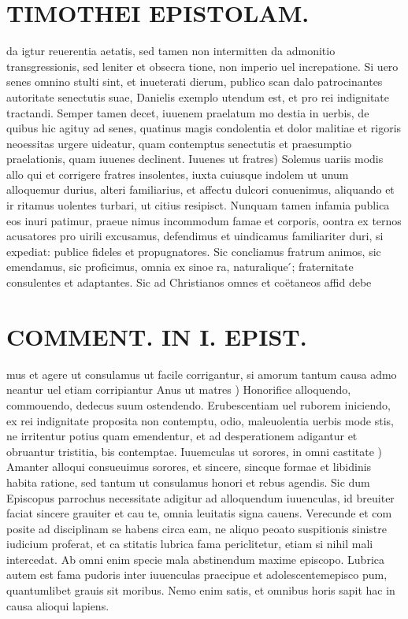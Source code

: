 \documentclass{article}
\begin{document}
\begin{pages}
\section*{TIMOTHEI EPISTOLAM. }
\marginpar{[ p.115 ]}\pstart da igtur reuerentia aetatis, sed tamen non intermitten da admonitio transgressionis, sed leniter et obsecra tione, non imperio uel increpatione. Si uero senes omnino stulti sint, et inueterati dierum, publico scan dalo patrocinantes autoritate senectutis suae, Danielis exemplo utendum est, et pro rei indignitate tractandi. Semper tamen decet, iuuenem praelatum mo destia in uerbis, de quibus hic agituy ad senes, quatinus magis condolentia et dolor malitiae et rigoris neoessitas urgere uideatur, quam contemptus senectutis et praesumptio praelationis, quam iuuenes declinent.  \pend\pstart Iuuenes ut fratres) Solemus uariis modis allo qui et corrigere fratres insolentes, iuxta cuiusque indolem ut unum alloquemur durius, alteri familiarius, et affectu dulcori conuenimus, aliquando et ir ritamus uolentes turbari, ut citius resipisct. Nunquam tamen infamia publica eos inuri patimur, praeue nimus incommodum famae et corporis, oontra ex ternos acusatores pro uirili excusamus, defendimus et uindicamus familiariter duri, si expediat: publice fideles et propugnatores. Sic concliamus fratrum animos, sic emendamus, sic proficimus, omnia ex sinoe ra, naturalique ́; fraternitate consulentes et adaptantes. Sic ad Christianos omnes et coëtaneos affid debe\pend
\section*{COMMENT. IN I. EPIST. }
\marginpar{[ p.116 ]}\pstart mus et agere ut consulamus ut facile corrigantur, si amorum tantum causa admo neantur uel etiam corripiantur  \pend\pstart Anus ut matres ) Honorifice alloquendo, commouendo, dedecus suum ostendendo. Erubescentiam uel ruborem iniciendo, ex rei indignitate proposita non contemptu, odio, maleuolentia uerbis mode stis, ne irritentur potius quam emendentur, et ad desperationem adigantur et obruantur tristitia, bis contemptae.  \pend\pstart Iuuemculas ut sorores, in omni castitate ) Amanter alloqui consueuimus sorores, et sincere, sincque formae et libidinis habita ratione, sed tantum ut consulamus honori et rebus agendis. Sic dum Episcopus parrochus necessitate adigitur ad alloquendum iuuenculas, id breuiter faciat sincere grauiter et cau te, omnia leuitatis signa cauens. Verecunde et com posite ad disciplinam se habens circa eam, ne aliquo peoato suspitionis sinistre iudicium proferat, et ca stitatis lubrica fama periclitetur, etiam si nihil mali intercedat. Ab omni enim specie mala abstinendum maxime episcopo. Lubrica autem est fama pudoris inter iuuenculas praecipue et adolescentemepisco pum, quantumlibet grauis sit moribus. Nemo enim satis, et omnibus horis sapit hac in causa alioqui lapiens.  \pend

\end{pages}
\end{document}
